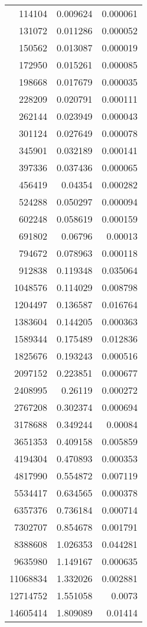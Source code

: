 \begin{longtable}{r r r}
114104 & 0.009624 & 0.000061 \\
131072 & 0.011286 & 0.000052 \\
150562 & 0.013087 & 0.000019 \\
172950 & 0.015261 & 0.000085 \\
198668 & 0.017679 & 0.000035 \\
228209 & 0.020791 & 0.000111 \\
262144 & 0.023949 & 0.000043 \\
301124 & 0.027649 & 0.000078 \\
345901 & 0.032189 & 0.000141 \\
397336 & 0.037436 & 0.000065 \\
456419 & 0.04354 & 0.000282 \\
524288 & 0.050297 & 0.000094 \\
602248 & 0.058619 & 0.000159 \\
691802 & 0.06796 & 0.00013 \\
794672 & 0.078963 & 0.000118 \\
912838 & 0.119348 & 0.035064 \\
1048576 & 0.114029 & 0.008798 \\
1204497 & 0.136587 & 0.016764 \\
1383604 & 0.144205 & 0.000363 \\
1589344 & 0.175489 & 0.012836 \\
1825676 & 0.193243 & 0.000516 \\
2097152 & 0.223851 & 0.000677 \\
2408995 & 0.26119 & 0.000272 \\
2767208 & 0.302374 & 0.000694 \\
3178688 & 0.349244 & 0.00084 \\
3651353 & 0.409158 & 0.005859 \\
4194304 & 0.470893 & 0.000353 \\
4817990 & 0.554872 & 0.007119 \\
5534417 & 0.634565 & 0.000378 \\
6357376 & 0.736184 & 0.000714 \\
7302707 & 0.854678 & 0.001791 \\
8388608 & 1.026353 & 0.044281 \\
9635980 & 1.149167 & 0.000635 \\
11068834 & 1.332026 & 0.002881 \\
12714752 & 1.551058 & 0.0073 \\
14605414 & 1.809089 & 0.01414 \\

\end{longtable}
